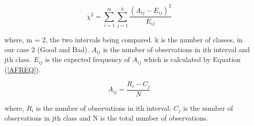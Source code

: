 \begin{equation}\label{CHI}
\chi^2 = \sum^{m}_{i=1}\sum^{k}_{j=1} \dfrac{(A_{ij} - E_{ij})^2}{ E_{ij}}
\end{equation}

where, m = 2, the two intervals being compared. k is the number of classes, in our case 2 (Good and Bad). $A_{ij}$ is the number of observations in ith interval and jth class. $E_{ij}$ is the expected frequency of $A_{ij}$ which is calculated by Equation (\ref{AFREQ}).

\begin{equation}\label{AFREQ}
A_{ij} = \dfrac{R_i - C_j}{N}
\end{equation}

where, $R_i$ is the number of observations in ith interval. $C_j$ is the number of observations in jth class and N is the total number of observations.


